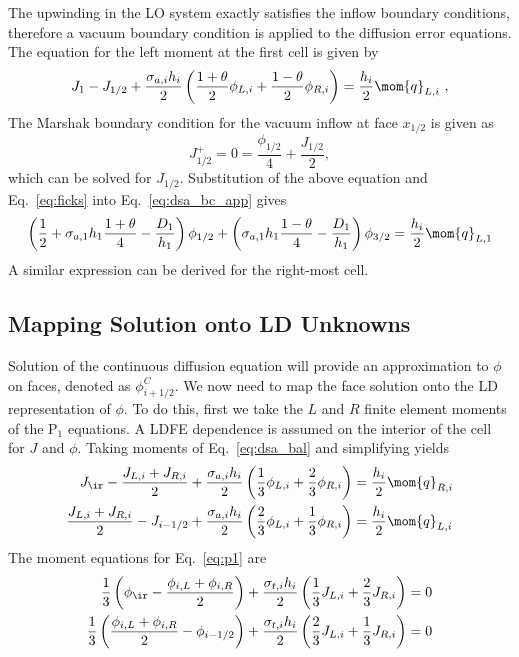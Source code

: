 The upwinding in the LO system exactly satisfies the inflow boundary conditions, therefore
a vacuum boundary condition is applied to the diffusion error equations.  The equation for the left moment
at the first cell is given by
\begin{equation}\label{eq:dsa_bc_app}
    J_{1} - J_{1/2}  + \frac{\sigma_{a,i}h_i}{2} \left(\frac{1+\theta}{2} \phi_{L,i}
    + \frac{1-\theta}{2}
    \phi_{R,i} \right) = \frac{h_i}{2} \mom{q}_{L,i}\,\,,
\end{equation}
The Marshak boundary condition for the vacuum inflow at face $x_{1/2}$ is given as
\begin{equation}
    J^+_{1/2} = 0 = \frac{\phi_{1/2}}{4} + \frac{J_{1/2}}{2},
\end{equation}
which can be solved for $J_{1/2}$.  Substitution of the above equation and
Eq.~\eqref{eq:ficks} into Eq.~\eqref{eq:dsa_bc_app} gives 
\begin{equation}\label{eq:bc_dsa}
    \left(\frac{1}{2}+ \sigma_{a,1}h_1\frac{1+\theta}{4} - \frac{D_1}{h_1}\right)\phi_{1/2} +
    \left( {\sigma_{a,1}{h_1}}\frac{1-\theta}{4} - \frac{D_1}{h_1}  \right)\phi_{3/2} =
    \frac{h_i}{2} \mom{q}_{L,1}
\end{equation}
A similar expression can be derived for the right-most cell.

\subsection{Mapping Solution onto LD Unknowns}

Solution of the continuous diffusion equation will provide an approximation to $\phi$ on
faces, denoted as $\phi_{i+1/2}^C$. We now need to map the face solution onto 
the LD representation of $\phi$. To do this, first we take the $L$ and $R$ finite element moments of the P$_1$
equations.  A LDFE dependence is assumed on the interior of the cell for $J$ and
$\phi$.  Taking moments of Eq.~\eqref{eq:dsa_bal} and simplifying yields
\begin{align}
    J_{\ir} - \frac{J_{L,i} + J_{R,i}}{2} + \frac{\sigma_{a,i} h_i}{2} \left(\frac{1}{3} \phi_{L,i} +
    \frac{2}{3}\phi_{R,i}\right) &= \frac{h_i}{2} \mom{q}_{R,i} \\
    \frac{J_{L,i} + J_{R,i}}{2} - J_{i-1/2} + \frac{\sigma_{a,i} h_i}{2}
    \left(\frac{2}{3} \phi_{L,i} +
    \frac{1}{3}\phi_{R,i}\right) &= \frac{h_i}{2} \mom{q}_{L,i}
\end{align}
The moment equations for Eq.~\eqref{eq:p1} are
\begin{align}
    \frac{1}{3}\left(\phi_{\ir} - \frac{\phi_{i,L} + \phi_{i,R}}{2}\right) +
    \frac{\sigma_{t,i} h_i}{2} \left(\frac{1}{3} J_{L,i} + \frac{2}{3}J_{R,i}\right)
    &= 0 \\
    \frac{1}{3}\left(\frac{\phi_{i,L} + \phi_{i,R}}{2} - \phi_{i-1/2} \right) +
    \frac{\sigma_{t,i} h_i}{2} \left(\frac{2}{3} J_{L,i} + \frac{1}{3}J_{R,i}\right)
    &= 0 
\end{align}

